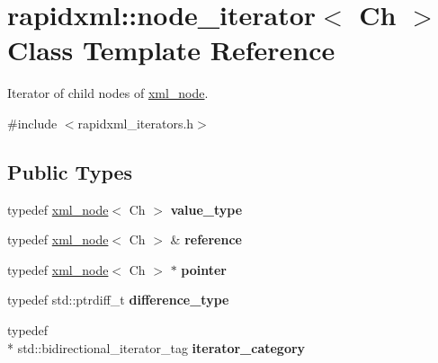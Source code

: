 \hypertarget{classrapidxml_1_1node__iterator}{\section{rapidxml\+:\+:node\+\_\+iterator$<$ Ch $>$ Class Template Reference}
\label{classrapidxml_1_1node__iterator}
}


Iterator of child nodes of \hyperlink{singletonrapidxml_1_1xml__node}{xml\+\_\+node}.  




{\ttfamily \#include $<$rapidxml\+\_\+iterators.\+h$>$}

\subsection*{Public Types}
\begin{DoxyCompactItemize}
\item 
\hypertarget{classrapidxml_1_1node__iterator_ade6310119ed1f72c94830e006fac69b7}{typedef \hyperlink{singletonrapidxml_1_1xml__node}{xml\+\_\+node}$<$ Ch $>$ {\bfseries value\+\_\+type}}\label{classrapidxml_1_1node__iterator_ade6310119ed1f72c94830e006fac69b7}

\item 
\hypertarget{classrapidxml_1_1node__iterator_ad7fabbcb7d3d9e4e220299c5475b9e9c}{typedef \hyperlink{singletonrapidxml_1_1xml__node}{xml\+\_\+node}$<$ Ch $>$ \& {\bfseries reference}}\label{classrapidxml_1_1node__iterator_ad7fabbcb7d3d9e4e220299c5475b9e9c}

\item 
\hypertarget{classrapidxml_1_1node__iterator_a65dca8bca2b9c29f635b9ad0bdeeecb9}{typedef \hyperlink{singletonrapidxml_1_1xml__node}{xml\+\_\+node}$<$ Ch $>$ $\ast$ {\bfseries pointer}}\label{classrapidxml_1_1node__iterator_a65dca8bca2b9c29f635b9ad0bdeeecb9}

\item 
\hypertarget{classrapidxml_1_1node__iterator_a5bdc462b980a52c5fa2d99ac9f4f4bff}{typedef std\+::ptrdiff\+\_\+t {\bfseries difference\+\_\+type}}\label{classrapidxml_1_1node__iterator_a5bdc462b980a52c5fa2d99ac9f4f4bff}

\item 
\hypertarget{classrapidxml_1_1node__iterator_a8e82d75f768e17bf7349d010ee26c037}{typedef \\*
std\+::bidirectional\+\_\+iterator\+\_\+tag {\bfseries iterator\+\_\+category}}\label{classrapidxml_1_1node__iterator_a8e82d75f768e17bf7349d010ee26c037}

\end{DoxyCompactItemize}
